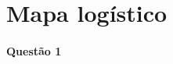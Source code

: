 \documentclass[a4paper,11pt]{article}
\title{\tituloCapa}
\begin{document}

\section{Mapa logístico}
\paragraph{Questão 1}
\end{document}
